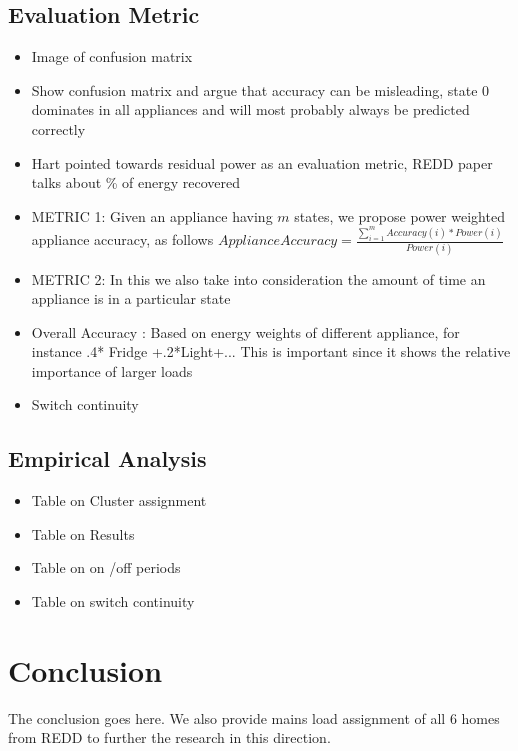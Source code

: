 \documentclass[conference]{IEEEtran}
\begin{document}
\subsection{Evaluation Metric}
\begin{itemize}
\item Image of confusion matrix
\item Show confusion matrix and argue that accuracy can be misleading, state 0 dominates in all appliances and will most probably always be predicted correctly
\item Hart pointed towards residual power as an evaluation metric, REDD paper talks about \% of energy recovered
\item METRIC 1: Given an appliance having $m$ states, we propose power weighted appliance accuracy, as follows
$Appliance Accuracy = \frac{\sum\limits_{i=1}^{m} Accuracy(i)*Power(i)}{Power(i)} $
\item METRIC 2: In this we also take into consideration the amount of time an appliance is in a particular state
\item Overall Accuracy : Based on energy weights of different appliance, for instance .4* Fridge +.2*Light+...
This is important since it shows the relative importance of larger loads 
\item Switch continuity
\end{itemize}

\subsection{Empirical Analysis}

\begin{itemize}
\item Table on Cluster assignment
\item Table on Results
\item Table on on /off periods
\item Table on switch continuity
\end{itemize}



\section{Conclusion}
The conclusion goes here.
We also provide mains load assignment of all 6 homes from REDD to further the research in this direction.
\end{document}
